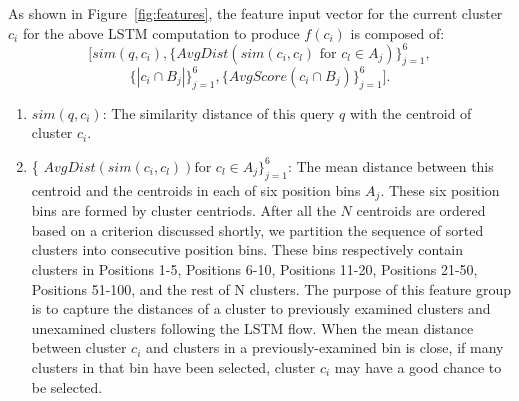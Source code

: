 
As shown in Figure~\ref{fig:features}, the feature input vector for the current cluster  $c_i$ for the above LSTM computation to produce $f(c_i)$
is composed of:
\[
[ sim(q,c_i),   
\{ AvgDist(sim(c_i, c_l) \text{ for } c_l \in A_j) \}^6_{j=1}, 
\]
\[ 
     \{  |c_i  \cap  B_j|    \}^{6}_{j=1},  
\{  AvgScore (c_i  \cap  B_j)    \}^{6}_{j=1} 
]. 
\] 
\begin{enumerate}[leftmargin=*]
    \item $sim(q,c_i)$: The similarity distance of this query $q$ with the centroid of cluster $c_i$.  
  
\item  \{  $AvgDist(sim(c_i, c_l)) \text{for } c_l \in A_j \}^6_{j=1}$: 
The mean distance between this centroid and the centroids in each of six position bins $A_j$.
These six position bins  are formed by cluster centriods. 
After all the $N$ centroids are ordered based on a criterion discussed shortly, we partition the sequence of sorted clusters into consecutive position bins.
These bins respectively contain clusters in Positions  1-5, Positions 6-10, 
Positions 11-20, Positions 21-50, Positions 51-100, and the rest of N clusters. 
The purpose of this feature group is to capture the distances of a cluster to previously examined clusters and unexamined clusters following the LSTM flow. 
When the mean distance  between cluster $c_i$  and clusters in a previously-examined  bin is close, if  many clusters in that bin have been selected, cluster 
$c_i$ may have a good  chance to  be selected.

    

\end{enumerate}
